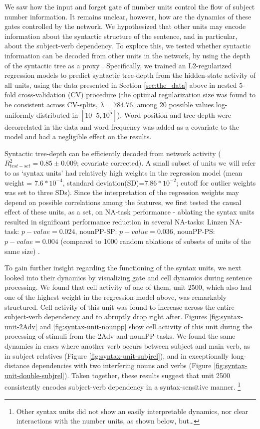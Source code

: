We saw how the input and forget gate of number units control the flow
of subject number information. It remains unclear, however, how are
the dynamics of these gates controlled by the network. We hypothesized
that other units may encode information about the syntactic structure
of the sentence, and in particular, about the subject-verb
dependency. To explore this, we tested whether syntactic information
can be decoded from other units in the network, by using the depth of
the syntactic tree as a proxy \cite{Nelson:etal:2017}. Specifically,
we trained an L2-regularized regression models to predict
syntactic tree-depth from the hidden-state activity of all units,
using the data presented in Section \ref{sec:the_data} above in nested
5-fold cross-validation (CV) procedure (the optimal regularization size was found to be consistent across CV-splits, $\lambda=784.76$, among 20 possible values log-uniformly distributed in $[10^-5, 10^5]$). Word position and tree-depth were decorrelated in the data and word frequency was added as a covariate
to the model and had a negligible effect on the results.

Syntactic tree-depth can be efficiently decoded from network activity
($R^2_{test-set}=0.85\pm0.009$; covariate corrected). A small subset of units we will refer to
as `syntax units' had relatively high weights in the regression model (mean weight = $7.6*10^{-4}$, standard deviation(SD)=$7.86*10^{-2}$; cutoff for outlier weights was set to three SDs). Since the interpretation of the regression weights may depend on possible correlations among the features, we first tested the causal effect of these units, as a set, on NA-task performance - ablating the syntax units resulted in significant performance reduction in several NA-tasks: Linzen NA-task: $p-value=0.024$, nounPP-SP: $p-value=0.036$, nounPP-PS: $p-value=0.004$ (compared to 1000 random ablations of subsets of units of the same size) .

To gain further insight regarding the functioning of the syntax units, we next looked into their dynamics by visualizing gate and cell dynamics during sentence processing. We found that
cell activity of one of them, unit \unit{2}{500},
which also had one of the highest weight in the regression model above, was
remarkably structured. Cell activity of this unit was found to
increase across the entire subject-verb dependency and to abruptly
drop right after. Figures \ref{fig:syntax-unit-2Adv} and
\ref{fig:syntax-unit-nounpp} show cell activity of this unit during
the processing of stimuli from the 2Adv and nounPP tasks. We found the
same dynamics in cases where another verb occurs between subject and
main verb, as in subject relatives (Figure
\ref{fig:syntax-unit-subjrel}), and in exceptionally long-distance
dependencies with two interfering nouns and verbs (Figure
\ref{fig:syntax-unit-double-subjrel}). Taken together, these results
suggest that unit \unit{2}{500} consistently encodes
subject-verb dependency in a syntax-sensitive manner. 
\footnote{Other syntax units did not show an easily interpretable
  dynamics, nor clear interactions with the number units, as shown below, but\ldots}

